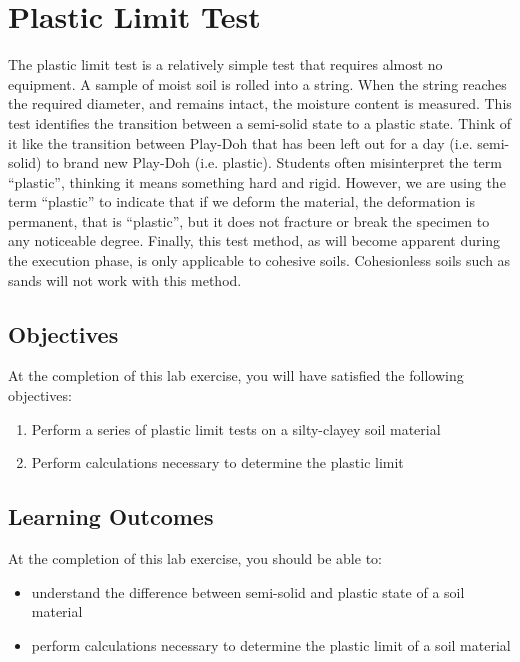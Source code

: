 \documentclass[12pt]{article}
\begin{document}
\section{Plastic Limit Test}
\label{sec:intro}
\normalsize 
The plastic limit test is a relatively simple test that requires almost no equipment. A sample of moist soil is rolled into a string. When the string reaches the required diameter, and remains intact, the moisture content is measured. This test identifies the transition between a semi-solid state to a plastic state. Think of it like the transition between Play-Doh\textregistered{} that has been left out for a day (i.e. semi-solid) to brand new Play-Doh\textregistered{} (i.e. plastic). Students often misinterpret the term ``plastic'', thinking it means something hard and rigid. However, we are using the term ``plastic'' to indicate that if we deform the material, the deformation is permanent, that is ``plastic'', but it does not fracture or break the specimen to any noticeable degree. Finally, this test method, as will become apparent during the execution phase, is only applicable to cohesive soils. Cohesionless soils such as sands will not work with this method.

\subsection{Objectives}
\label{ssec:headingscap}
At the completion of this lab exercise, you will have satisfied the following objectives:
\begin{enumerate}
    \item Perform a series of plastic limit tests on a silty-clayey soil material
    \item Perform calculations necessary to determine the plastic limit
\end{enumerate}

\subsection{Learning Outcomes}
At the completion of this lab exercise, you should be able to:
\begin{itemize}
    \item understand the difference between semi-solid and plastic state of a soil material
    \item perform calculations necessary to determine the plastic limit of a soil material
\end{itemize}
\end{document}

